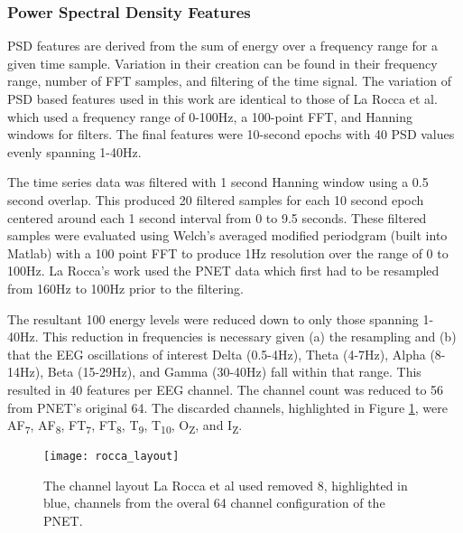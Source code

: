 \subsubsection{Power Spectral Density Features}

\ac{PSD} features are derived from the sum of energy over a frequency range for a given time sample. Variation in their creation can be found in their frequency range, number of \ac{FFT} samples, and filtering of the time signal. The variation of \ac{PSD} based features used in this work are identical to those of La Rocca et al. \cite{Rocca2014} which used a frequency range of 0-100Hz, a 100-point \ac{FFT}, and Hanning windows for filters. The final features were 10-second epochs with 40 \ac{PSD} values evenly spanning 1-40Hz.

The time series data was filtered with 1 second Hanning window using a 0.5 second overlap. This produced 20 filtered samples for each 10 second epoch centered around each 1 second interval from 0 to 9.5 seconds. These filtered samples were evaluated using Welch's averaged modified periodgram (built into Matlab) with a 100 point \ac{FFT} to produce 1Hz resolution over the range of 0 to 100Hz. La Rocca's work used the \ac{PNET} data which first had to be resampled from 160Hz to 100Hz prior to the filtering.

The resultant 100 energy levels were reduced down to only those spanning 1-40Hz. This reduction in frequencies is necessary given (a) the resampling and (b) that the \ac{EEG} oscillations of interest Delta (0.5-4Hz), Theta (4-7Hz), Alpha (8-14Hz), Beta (15-29Hz), and Gamma (30-40Hz) fall within that range. This resulted in 40 features per \ac{EEG} channel. The channel count was reduced to 56 from \ac{PNET}'s original 64. The discarded channels, highlighted in Figure \ref{fig-chap3_roccaLayout}, were AF\textsubscript{7}, AF\textsubscript{8}, FT\textsubscript{7}, FT\textsubscript{8}, T\textsubscript{9}, T\textsubscript{10}, O\textsubscript{Z}, and I\textsubscript{Z}.

\begin{figure}
\centering
\texttt{[image: rocca\_layout]}
\caption[Layout of La Rocca's PSD and COH Channels.]{The channel layout La Rocca et al used removed 8, highlighted in blue, channels from the overal 64 channel configuration of the \ac{PNET}.}
\label{fig-chap3_roccaLayout}
\end{figure}

